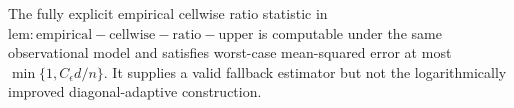 The fully explicit empirical cellwise ratio statistic in \(\mathrm{lem:empirical-cellwise-ratio-upper}\) is computable under the same observational model and satisfies worst-case mean-squared error at most \(\min\{1,C_\epsilon d/n\}\).  It supplies a valid fallback estimator but not the logarithmically improved diagonal-adaptive construction.